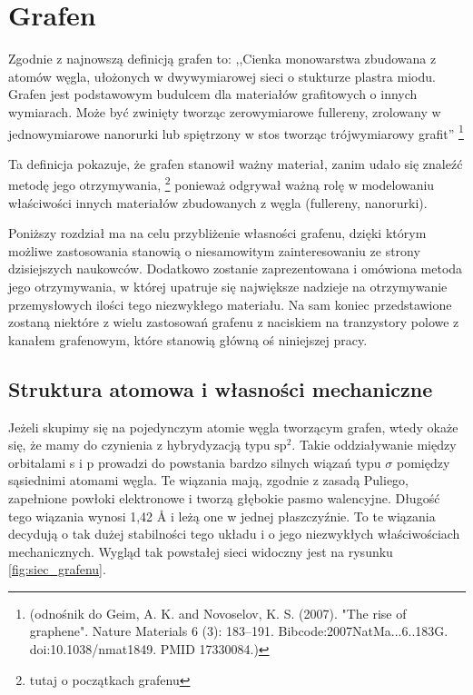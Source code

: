 \chapter{Grafen}
	Zgodnie z najnowszą definicją grafen to: ,,Cienka monowarstwa zbudowana z atomów węgla,
ułożonych w dwywymiarowej sieci o stukturze plastra miodu. Grafen jest podstawowym budulcem
dla materiałów grafitowych o innych wymiarach. Może być zwinięty tworząc zerowymiarowe fullereny,
zrolowany w jednowymiarowe nanorurki lub spiętrzony w stos tworząc trójwymiarowy grafit''	
\footnote[1]{(odnośnik do Geim, A. K. and Novoselov, K. S. (2007). "The rise of graphene". Nature Materials 6 (3): 183–191. 					Bibcode:2007NatMa...6..183G. doi:10.1038/nmat1849. PMID 17330084.)}

	Ta definicja pokazuje, że grafen stanowił ważny materiał, zanim udało się znaleźć metodę jego otrzymywania, \footnote[2]{tutaj o początkach grafenu} ponieważ odgrywał ważną rolę w modelowaniu właściwości innych materiałów zbudowanych z węgla (fullereny, nanorurki).
	
Poniższy rozdział ma na celu przybliżenie własności grafenu, dzięki którym możliwe
zastosowania stanowią o niesamowitym zainteresowaniu ze strony dzisiejszych naukowców. Dodatkowo
zostanie zaprezentowana i omówiona metoda jego otrzymywania, w której upatruje się 
największe nadzieje na otrzymywanie przemysłowych ilości tego niezwykłego materiału.
Na sam koniec przedstawione zostaną niektóre z wielu zastosowań grafenu z naciskiem na
tranzystory polowe z kanałem grafenowym, które stanowią główną oś niniejszej pracy.

\newpage

	\section{Struktura atomowa i własności mechaniczne}
	Jeżeli skupimy się na pojedynczym atomie węgla tworzącym grafen, wtedy okaże się, że 
	mamy do czynienia z hybrydyzacją typu $\mathrm{sp^2}$. Takie oddziaływanie między
	orbitalami s i p prowadzi do powstania bardzo silnych wiązań typu $\sigma$ pomiędzy
	sąsiednimi atomami węgla. Te wiązania mają, zgodnie z zasadą Puliego, zapełnione 
	powłoki elektronowe i tworzą głębokie pasmo walencyjne. Długość tego wiązania wynosi
	1,42 Å i leżą one w jednej płaszczyźnie. To te wiązania decydują o tak dużej stabilności tego
	układu i o jego niezwykłych właściwościach mechanicznych. Wygląd tak powstałej sieci widoczny jest na 
	rysunku \ref{fig:siec_grafenu}. 
	
